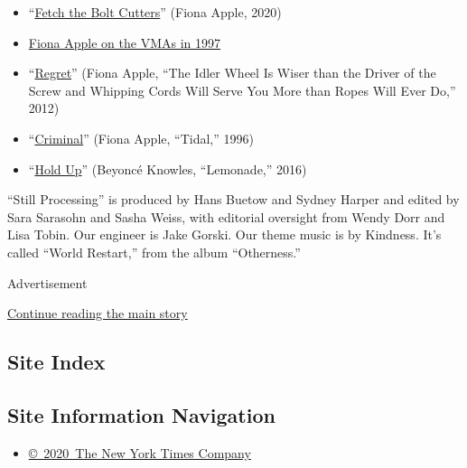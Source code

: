 \begin{itemize}
\item
  ``\href{https://www.youtube.com/watch?v=N541HLPeG6Y\&list=OLAK5uy_nvvTVXc476e1vHBGAN7Y-DH9_sZjOhgx8}{Fetch
  the Bolt Cutters}'' (Fiona Apple, 2020)
\item
  \href{https://www.youtube.com/watch?v=42gNkySFycA}{Fiona Apple on the
  VMAs in 1997}
\item
  ``\href{https://www.youtube.com/watch?v=9W9Un3rIzns}{Regret}'' (Fiona
  Apple, ``The Idler Wheel Is Wiser than the Driver of the Screw and
  Whipping Cords Will Serve You More than Ropes Will Ever Do,'' 2012)
\item
  ``\href{https://www.youtube.com/watch?v=FFOzayDpWoI}{Criminal}''
  (Fiona Apple, ``Tidal,'' 1996)
\item
  ``\href{https://www.youtube.com/watch?v=PeonBmeFR8o}{Hold Up}''
  (Beyoncé Knowles, ``Lemonade,'' 2016)
\end{itemize}

``Still Processing'' is produced by Hans Buetow and Sydney Harper and
edited by Sara Sarasohn and Sasha Weiss, with editorial oversight from
Wendy Dorr and Lisa Tobin. Our engineer is Jake Gorski. Our theme music
is by Kindness. It's called ``World Restart,'' from the album
``Otherness.''

Advertisement

\protect\hyperlink{after-bottom}{Continue reading the main story}

\hypertarget{site-index}{%
\subsection{Site Index}\label{site-index}}

\hypertarget{site-information-navigation}{%
\subsection{Site Information
Navigation}\label{site-information-navigation}}

\begin{itemize}
\tightlist
\item
  \href{https://help.nytimes.com/hc/en-us/articles/115014792127-Copyright-notice}{©~2020~The
  New York Times Company}
\end{itemize}

